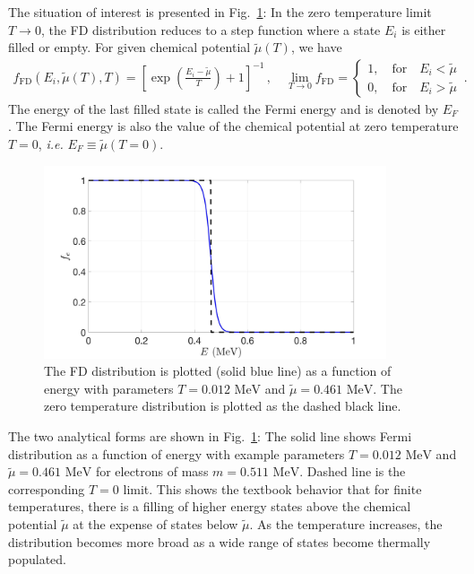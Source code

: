 \documentclass[sn-mathphys,Numbered]{sn-jnl}
\newcommand{\rf}[1]{Fig.~{\ref{#1}}}
\newcommand*{\MeV}{\text{ MeV}}
\begin{document}
The situation of interest is presented in \rf{Electron_001}: In the zero temperature limit $T\to0$, the FD distribution reduces to a step function where a state $E_{i}$ is either filled or empty. For given chemical potential $\widetilde\mu(T)$, we have
\begin{align}
\label{f_old}
f_\mathrm{FD}(E_{i},\widetilde\mu(T),T)=\left[\exp\left(\frac{E_{i}-\widetilde\mu}{T}\right)+1\right]^{-1}\,,\quad
\lim_{T\to0}f_\mathrm{FD}=\left\{
\begin{array}{c}
1,\quad\mathrm{for}\quad{E_{i}}<\widetilde\mu\\
0,\quad\mathrm{for}\quad{E_{i}}>\widetilde\mu
\end{array}
\right.\,.
\end{align}
The energy of the last filled state is called the Fermi energy and is denoted by $E_F$. The Fermi energy is also the value of the chemical potential at zero temperature $T=0$, \emph{i.e.} $E_F\equiv\widetilde\mu(T = 0)$.
\begin{figure}[ht]
\centering
\includegraphics[width=0.9\textwidth]{./plot/Electron_distribution001}
\caption{The FD distribution is plotted (solid blue line) as a function of energy with parameters $T=0.012\MeV$ and $\widetilde\mu=0.461\MeV$. The zero temperature distribution is plotted as the dashed black line.}
\label{Electron_001}
\end{figure}

The two analytical forms are shown in \rf{Electron_001}: The solid line shows Fermi distribution as a function of energy with example parameters $T=0.012\MeV$ and $\widetilde\mu=0.461\MeV$ for electrons of mass $m=0.511\MeV$. Dashed line is the corresponding $T=0$ limit.  This shows the textbook behavior that for finite temperatures, there is a filling of higher energy states above the chemical potential $\widetilde\mu$ at the expense of states below $\widetilde\mu$. As the temperature increases, the distribution becomes more broad as a wide range of states become thermally populated.
\end{document}
